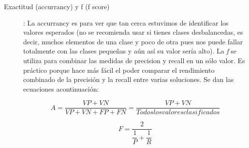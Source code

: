 \begin{description}
 \item [Exactitud (accurrancy) y f (f score)]: La accurrancy es para ver que tan cerca estuvimos de identificar los valores esperados (no se recomienda usar si tienes clases desbalancedas, es decir, muchos elementos de una clase y poco de otra pues nos puede fallar totalmente con las clases pequeñas y aún así su valor sería alto). La \emph{f} se utiliza para combinar las medidas de precision y recall en un sólo valor. Es práctico porque hace más fácil el poder comparar el rendimiento combinado de la precisión y la recall entre varias soluciones. Se dan las ecuaciones acontinuación:
    
    \begin{equation}
     A = \dfrac{VP+VN}{VP + VN + FP + FN} = \dfrac{VP+VN}{Todos los valores clasificados}     
    \end{equation}

    \begin{equation}
     F = \dfrac{2}{\dfrac{1}{P} +\dfrac{1}{R} }
    \end{equation}

\end{description}

